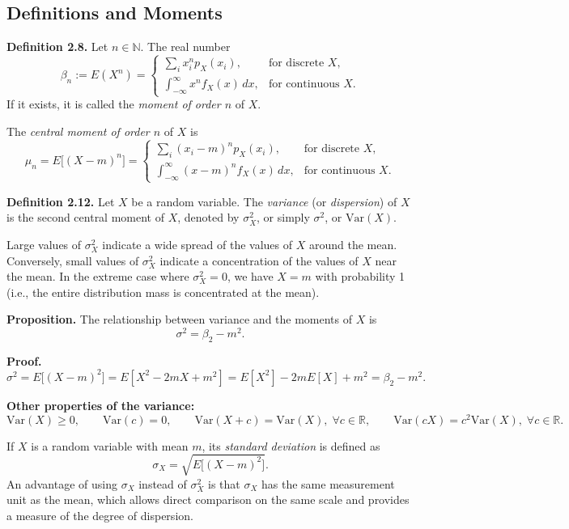 \documentclass[12pt]{article}
\begin{document}
\subsection{Definitions and Moments}

\textbf{Definition 2.8.}  
Let $n \in \mathbb{N}$. The real number
\[
\beta_n := E(X^n) =
\begin{cases}
\displaystyle \sum_i x_i^n p_X(x_i), & \text{for discrete } X,\\[1em]
\displaystyle \int_{-\infty}^{\infty} x^n f_X(x)\,dx, & \text{for continuous } X.
\end{cases}
\]
If it exists, it is called the \textit{moment of order $n$} of $X$.

The \textit{central moment of order $n$} of $X$ is
\[
\mu_n = E\big[(X - m)^n\big] =
\begin{cases}
\displaystyle \sum_i (x_i - m)^n p_X(x_i), & \text{for discrete } X,\\[1em]
\displaystyle \int_{-\infty}^{\infty} (x - m)^n f_X(x)\,dx, & \text{for continuous } X.
\end{cases}
\]

\textbf{Definition 2.12.}  
Let $X$ be a random variable. The \textit{variance} (or \textit{dispersion}) of $X$ is the second central moment of $X$, denoted by $\sigma_X^2$, or simply $\sigma^2$, or $\mathrm{Var}(X)$.

Large values of $\sigma_X^2$ indicate a wide spread of the values of $X$ around the mean.  
Conversely, small values of $\sigma_X^2$ indicate a concentration of the values of $X$ near the mean.  
In the extreme case where $\sigma_X^2 = 0$, we have $X = m$ with probability 1 (i.e., the entire distribution mass is concentrated at the mean).

\textbf{Proposition.}  
The relationship between variance and the moments of $X$ is
\[
\sigma^2 = \beta_2 - m^2.
\]

\textbf{Proof.}
\[
\sigma^2 = E\big[(X - m)^2\big] = E[X^2 - 2mX + m^2]
= E[X^2] - 2mE[X] + m^2 = \beta_2 - m^2.
\]

\textbf{Other properties of the variance:}
\[
\mathrm{Var}(X) \ge 0, \qquad
\mathrm{Var}(c) = 0, \qquad
\mathrm{Var}(X + c) = \mathrm{Var}(X), \; \forall c \in \mathbb{R}, \qquad
\mathrm{Var}(cX) = c^2 \mathrm{Var}(X), \; \forall c \in \mathbb{R}.
\]

If $X$ is a random variable with mean $m$, its \textit{standard deviation} is defined as
\[
\sigma_X = \sqrt{E\big[(X - m)^2\big]}.
\]
An advantage of using $\sigma_X$ instead of $\sigma_X^2$ is that $\sigma_X$ has the same measurement unit as the mean, which allows direct comparison on the same scale and provides a measure of the degree of dispersion.
\end{document}
